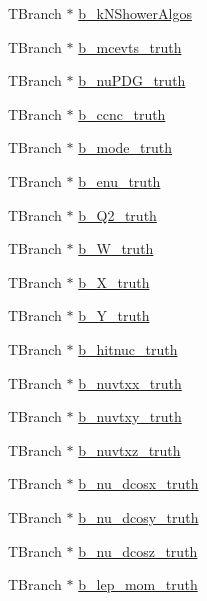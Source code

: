 \begin{DoxyCompactItemize}
\item 
T\-Branch $\ast$ \hyperlink{classanatree_a4f4dabebafc8ecf9a74aadc86d06969a}{b\-\_\-k\-N\-Shower\-Algos}
\item 
T\-Branch $\ast$ \hyperlink{classanatree_af9d0e10617d6ded57b904cdf2fcd3ab1}{b\-\_\-mcevts\-\_\-truth}
\item 
T\-Branch $\ast$ \hyperlink{classanatree_a9d52ebb2157d72b322c1f54152e76d8f}{b\-\_\-nu\-P\-D\-G\-\_\-truth}
\item 
T\-Branch $\ast$ \hyperlink{classanatree_a8c271e54ceb7cb3e262cfc008580b3d7}{b\-\_\-ccnc\-\_\-truth}
\item 
T\-Branch $\ast$ \hyperlink{classanatree_a0125f3c959d85805467e858dde15a165}{b\-\_\-mode\-\_\-truth}
\item 
T\-Branch $\ast$ \hyperlink{classanatree_a0ac5659f51301d287bf9d9bbc3f50d6c}{b\-\_\-enu\-\_\-truth}
\item 
T\-Branch $\ast$ \hyperlink{classanatree_a7caf886dbc743a275fb12bba23075719}{b\-\_\-\-Q2\-\_\-truth}
\item 
T\-Branch $\ast$ \hyperlink{classanatree_a1fb7be4562a99e8c9a96aaac02eb9dbc}{b\-\_\-\-W\-\_\-truth}
\item 
T\-Branch $\ast$ \hyperlink{classanatree_a19023f687358f7ef7d6e6a81341d48c1}{b\-\_\-\-X\-\_\-truth}
\item 
T\-Branch $\ast$ \hyperlink{classanatree_aaa328ace7dd04c581ea6c12d187a07ad}{b\-\_\-\-Y\-\_\-truth}
\item 
T\-Branch $\ast$ \hyperlink{classanatree_acfd4b17208b7e08e4ee3770a09d1b19e}{b\-\_\-hitnuc\-\_\-truth}
\item 
T\-Branch $\ast$ \hyperlink{classanatree_a6f5a62dc119d648736a8c506fcfcea4a}{b\-\_\-nuvtxx\-\_\-truth}
\item 
T\-Branch $\ast$ \hyperlink{classanatree_aa7d28f6964a4ca942f27eb07b9ebe3ed}{b\-\_\-nuvtxy\-\_\-truth}
\item 
T\-Branch $\ast$ \hyperlink{classanatree_a1cbee5b82d3a4b37c1d1ad8a05440bec}{b\-\_\-nuvtxz\-\_\-truth}
\item 
T\-Branch $\ast$ \hyperlink{classanatree_aade18245efa8cc10cdad1b45b928491c}{b\-\_\-nu\-\_\-dcosx\-\_\-truth}
\item 
T\-Branch $\ast$ \hyperlink{classanatree_aa937bf9c02bab49e5f07de8ce5f359a8}{b\-\_\-nu\-\_\-dcosy\-\_\-truth}
\item 
T\-Branch $\ast$ \hyperlink{classanatree_ab94db41a77a084076e4f394da09c377f}{b\-\_\-nu\-\_\-dcosz\-\_\-truth}
\item 
T\-Branch $\ast$ \hyperlink{classanatree_a46fc39330907911f95de958e933bfd53}{b\-\_\-lep\-\_\-mom\-\_\-truth}

\end{DoxyCompactItemize}
